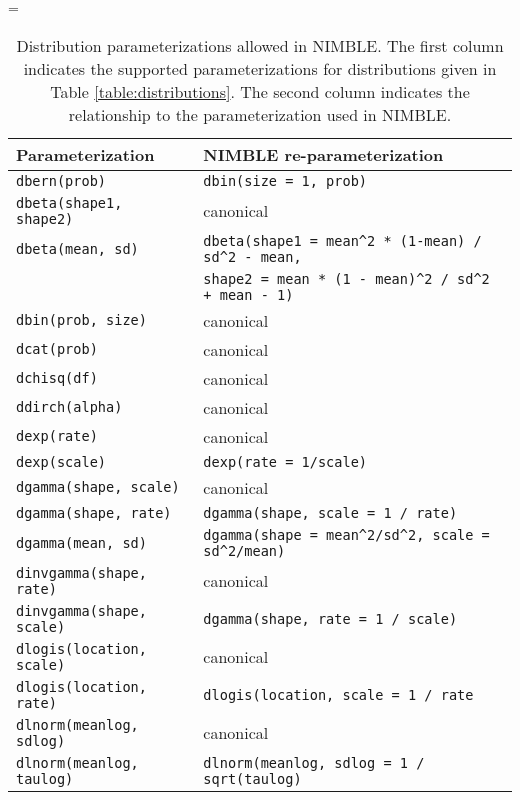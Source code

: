   \begin{center}
    \LTcapwidth=\textwidth
    \begin{longtable}{ll}

  \caption{Distribution parameterizations allowed in NIMBLE. The first
    column indicates the supported parameterizations for
    distributions given in Table \ref{table:distributions}. The second column indicates the
    relationship to the  parameterization used in
    NIMBLE. } \label{table:distributions-alternates}\\
      \hline
      Parameterization & NIMBLE re-parameterization \\
      \hline \hline
\endhead
   \texttt{dbern(prob)} & \texttt{dbin(size = 1, prob)} \\
      \texttt{dbeta(shape1, shape2)} & canonical \\
      \texttt{dbeta(mean, sd)} & \verb|dbeta(shape1 = mean^2 * (1-mean) / sd^2 - mean,| \\
      & \verb|shape2 = mean * (1 - mean)^2 / sd^2 + mean - 1)| \\
   \texttt{dbin(prob, size)} & canonical \\
         \texttt{dcat(prob)} & canonical \\
         \texttt{dchisq(df)} & canonical \\
         \texttt{ddirch(alpha)} & canonical \\
      \texttt{dexp(rate)} & canonical \\
       \texttt{dexp(scale)} & \texttt{dexp(rate = 1/scale)} \\
     \texttt{dgamma(shape, scale)} & canonical \\
      \texttt{dgamma(shape, rate)} & \verb|dgamma(shape, scale = 1 / rate)| \\
      \texttt{dgamma(mean, sd)} & \verb|dgamma(shape = mean^2/sd^2, scale = sd^2/mean)| \\
      \texttt{dinvgamma(shape, rate)} & canonical \\
     \texttt{dinvgamma(shape, scale)} & \verb|dgamma(shape, rate = 1 / scale)| \\
     \texttt{dlogis(location, scale)} & canonical \\
     \texttt{dlogis(location, rate)} & \verb|dlogis(location, scale = 1 / rate| \\
     \texttt{dlnorm(meanlog, sdlog)} & canonical \\
     \texttt{dlnorm(meanlog, taulog)} & \verb|dlnorm(meanlog, sdlog = 1 / sqrt(taulog)| \\

\end{longtable}
\end{center}
